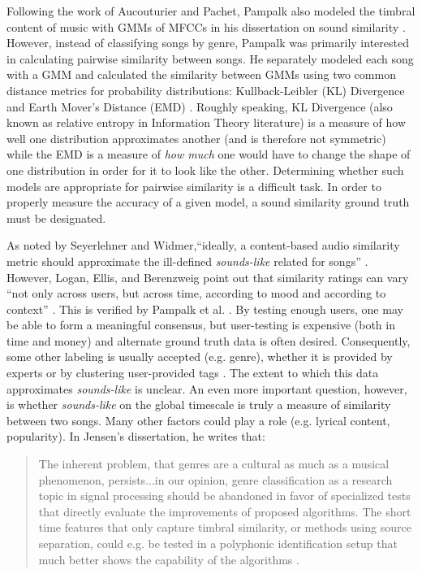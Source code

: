 \documentclass[a4paper,12pt]{report} 	%
\numberwithin{figure}{chapter}
\numberwithin{table}{chapter}
\numberwithin{equation}{chapter}
\begin{document}
\begin{flushleft}
Following the work of Aucouturier and Pachet, Pampalk also modeled the timbral content of music with GMMs of MFCCs in his dissertation on sound similarity \cite{Pampalk:2006pr}. However, instead of classifying songs by genre, Pampalk was primarily interested in calculating pairwise similarity between songs. He separately modeled each song with a GMM and calculated the similarity between GMMs using two common distance metrics for probability distributions: Kullback-Leibler (KL) Divergence and Earth Mover's Distance (EMD) \cite[p. 26]{Pampalk:2006pr}. Roughly speaking, KL Divergence (also known as relative entropy in Information Theory literature) is a measure of how well one distribution approximates another (and is therefore not symmetric) while the EMD is a measure of \emph{how much} one would have to change the shape of one distribution in order for it to look like the other. Determining whether such models are appropriate for pairwise similarity is a difficult task. In order to properly measure the accuracy of a given model, a sound similarity ground truth must be designated.

As noted by Seyerlehner and Widmer,``ideally, a content-based audio similarity metric should approximate the ill-defined \emph{sounds-like} related for songs'' \cite[p. 1]{Seyerlehner:2008tw}. However, Logan, Ellis, and Berenzweig point out that similarity ratings can vary ``not only across users, but across time, according to mood and according to context'' \cite[p. 1]{Logan:2003cr}. This is verified by Pampalk et al. \cite[p. 6]{Pampalk:2008xz}. By testing enough users, one may be able to form a meaningful consensus, but user-testing is expensive (both in time and money) and alternate ground truth data is often desired. Consequently, some other labeling is usually accepted (e.g. genre), whether it is provided by experts or by clustering user-provided tags \cite[p. 2]{Logan:2003cr}. The extent to which this data approximates \emph{sounds-like} is unclear. An even more important question, however, is whether \emph{sounds-like} on the global timescale is truly a measure of similarity between two songs. Many other factors could play a role (e.g. lyrical content, popularity). In Jensen's dissertation, he writes that:

\selectfont
\begin{quote} The inherent problem, that genres are a cultural as much as a musical phenomenon, persists...in our opinion, genre classification as a research topic in signal processing should be abandoned in favor of specialized tests that directly evaluate the improvements of proposed algorithms. The short time features that only capture timbral similarity, or methods using source separation, could e.g. be tested in a polyphonic identification setup that much better shows the capability of the algorithms \cite[p. 11]{Jensen:2009ta}.
\end{quote}
\selectfont


\end{flushleft}
\end{document}
